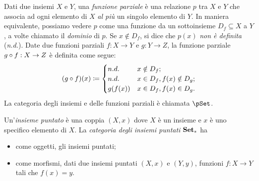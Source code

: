 \begin{example}\label{ex_cat_pfun}
	Dati due insiemi \(X\) e \(Y\), una \emph{funzione parziale} è una relazione \(p\) tra \(X\) e \(Y\) che associa ad ogni elemento di \(X\) \emph{al più} un singolo elemento di \(Y\). In maniera equivalente, possiamo vedere \(p\) come una funzione da un sottoinsieme \(D_f\subseteq X\) a \(Y\), a volte chiamato il \emph{dominio} di \(p\). Se \(x\notin D_f\), si dice che \(p(x)\) \emph{non è definita} (\emph{n.d.}).
	Date due funzioni parziali \(f:X\to Y\) e \(g:Y\to Z\), la funzione parziale \(g\circ f:X\to Z\) è definita come segue:
	\[
		(g\circ f) (x) \coloneqq \begin{cases}
			n.d.    & x\notin D_f ;              \\
			n.d.    & x\in D_f, f(x)\notin D_g ; \\
			g(f(x)) & x\in D_f, f(x)\in D_g .
		\end{cases}
	\]
	La categoria degli insiemi e delle funzioni parziali è chiamata \(\pSet\).
\end{example}
\begin{example}\label{ex_cat_puntati}
	Un'\emph{insieme puntato} è una coppia \((X,x)\) dove \(X\) è un insieme e \(x\) è uno specifico elemento di \(X\).
	La \emph{categoria degli insiemi puntati} \(\mathbf{Set}_*\) ha
	\begin{itemize}
		\item come oggetti, gli insiemi puntati;
		\item come morfismi, dati due insiemi puntati \((X,x)\) e \((Y,y)\), funzioni \(f:X\to Y\) tali che \(f(x)=y\).
	\end{itemize}
\end{example}
